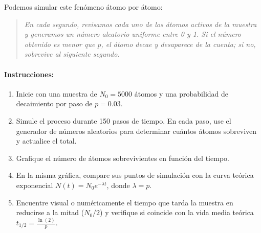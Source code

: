 \documentclass[12pt]{article}
\begin{document}
\begin{problemas}[]
\begin{enumerate}[leftmargin=*]
Podemos simular este fenómeno átomo por átomo:
\begin{quote}
    \itshape
    En cada segundo, revisamos cada uno de los átomos activos de la muestra y generamos un número aleatorio uniforme entre 0 y 1. Si el número obtenido es menor que $p$, el átomo decae y desaparece de la cuenta; si no, sobrevive al siguiente segundo.
\end{quote}

\paragraph{Instrucciones:}
\begin{enumerate}
    \item Inicie con una muestra de $N_0 = 5000$ átomos y una probabilidad de decaimiento por paso de $p = 0.03$.
    \item Simule el proceso durante 150 pasos de tiempo. En cada paso, use el generador de números aleatorios para determinar cuántos átomos sobreviven y actualice el total.
    \item Grafique el número de átomos sobrevivientes en función del tiempo.
    \item En la misma gráfica, compare sus puntos de simulación con la curva teórica exponencial $N(t) = N_0 e^{-\lambda t}$, donde $\lambda = p$.
    \item Encuentre visual o numéricamente el tiempo que tarda la muestra en reducirse a la mitad ($N_0 / 2$) y verifique si coincide con la vida media teórica $t_{1/2} = \frac{\ln(2)}{p}$.
\end{enumerate}

\end{enumerate}
\end{problemas}
\end{document}
